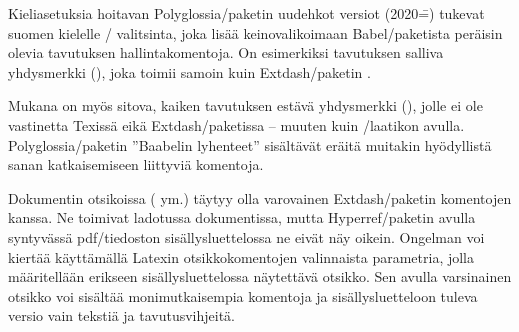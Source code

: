 
Kieli\-asetuksia hoitavan Polyglossia\-/paketin uudehkot versiot
(2020\==) tukevat suomen kielelle \-/ valitsinta,
joka lisää keinovalikoimaan Babel\-/paketista peräisin olevia tavutuksen
hallintakomentoja. On esimerkiksi tavutuksen salliva yhdysmerkki
(\koodi{\textquotedbl-}), joka toimii samoin kuin Extdash\-/paketin
\koodi{\keno -/}.

Mukana on myös sitova, kaiken tavutuksen estävä yhdysmerkki
(\koodi{\textquotedbl\textasciitilde}), jolle ei ole vastinetta Texissä
eikä Extdash\-/paketissa -- muuten kuin \-/laatikon
avulla. Polyglossia\-/paketin ''Baabelin lyhenteet'' sisältävät eräitä
muitakin hyödyllistä sanan katkaisemiseen liittyviä komentoja.

Dokumentin otsikoissa ( ym.) täytyy olla varovainen
Extdash\-/paketin komentojen kanssa. Ne toimivat ladotussa dokumentissa,
mutta Hyperref\-/paketin avulla syntyvässä pdf\-/tiedoston
sisällysluettelossa ne eivät näy oikein. Ongelman voi kiertää
käyttämällä Latexin otsikkokomentojen valinnaista parametria, jolla
määritellään erikseen sisällysluettelossa näytettävä otsikko. Sen avulla
varsinainen otsikko voi sisältää monimutkaisempia komentoja ja
sisällysluetteloon tuleva versio vain tekstiä ja tavutusvihjeitä.

